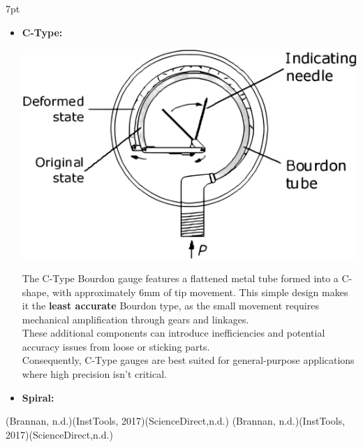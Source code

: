\documentclass{article}
\newcommand{\formalsource}{} %
\newenvironment{formal}[3][]{%
	\renewcommand{\formalsource}{#1}%
	\def\FrameCommand{%
		\hspace{1pt}%
		{\color{#2}\vrule width 2pt}%
		{\color{#3}\vrule width 4pt}%
		\colorbox{#3}%
	}%
	\MakeFramed{\advance\hsize-\width\FrameRestore}%
	\noindent\hspace{-4.55pt}%
	\begin{adjustwidth}{}{7pt}%
		\vspace{2pt}%
	}%
	{%
		\vspace{4pt}%
		\ifx\formalsource\empty %
		\else
		\hfill{\footnotesize{\formalsource}}%
		\fi
	\end{adjustwidth}\endMakeFramed%
}
\begin{document}
\begin{formal}[(Brannan, n.d.)(InstTools, 2017)(ScienceDirect,n.d.)]{black!60!white}{white}
\begin{itemize}
	\item \textbf{C-Type:}\\[8pt]
	\begin{minipage}{0.3\textwidth}\centering\hspace*{-1em}
		\includegraphics[width=1.1\textwidth]{images/ezgif-42a6b97cab4453(2)-Photoroom.png}
	\end{minipage}\hfill
	\begin{minipage}{0.6\textwidth}
		The C-Type Bourdon gauge features a flattened metal tube formed into a C-shape, with approximately 6mm of tip movement. This simple design makes it the \textbf{least accurate} Bourdon type, as the small movement requires mechanical amplification through gears and linkages.\\[5pt]
		These additional components can introduce inefficiencies and potential accuracy issues from loose or sticking parts.\\[5pt]
		Consequently, C-Type gauges are best suited for general-purpose applications where high precision isn't critical.
	\end{minipage}
   \item \textbf{Spiral:}\\[8pt]
	\begin{minipage}{0.3\textwidth}\centering

\end{minipage}
\end{itemize}
\end{formal}
\end{document}
